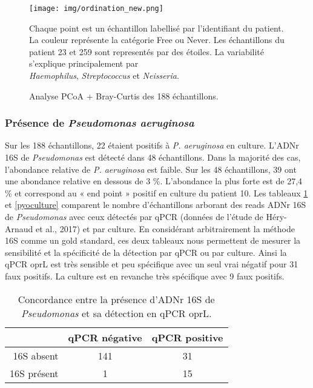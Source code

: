 \documentclass[12pt,a4paper]{article}
\begin{document}
\begin{figure}[H]
\begin{center}
\texttt{[image: img/ordination\_new.png]}\hfill
\caption{Analyse PCoA + Bray-Curtis des 188 échantillons.}
Chaque point est un échantillon labellisé par l'identifiant du patient. La couleur représente la catégorie Free ou Never. Les échantillons du patient 23 et 259 sont representés par des étoiles. La variabilité s'explique principalement par \\ \textit{Haemophilus}, \textit{Streptococcus} et \textit{Neisseria}.
\label{ordination2}
\end{center}
\end{figure}



\subsubsection{Présence de \textit{Pseudomonas aeruginosa}}
Sur les 188 échantillons, 22 étaient positifs à \textit{P. aeruginosa} en culture. L'ADNr 16S de \textit{Pseudomonas} est détecté dans 48 échantillons. Dans la majorité des cas, l'abondance relative de \textit{P. aeruginosa} est faible. Sur les 48 échantillons, 39 ont une abondance relative en dessous de 3 \%. L'abondance la plus forte est de 27,4 \% et correspond au « end point » positif en culture du patient 10.
Les tableaux \ref{pyopcr} et \ref{pyoculture} comparent le nombre d'échantillons arborant des reads ADNr 16S de \textit{Pseudomonas} avec ceux détectés par qPCR (données de l'étude de Héry-Arnaud et al., 2017\cite{Hery-Arnaud2017}) et par culture.
En considérant arbitrairement la méthode 16S comme un gold standard, ces deux tableaux nous permettent de mesurer la sensibilité et la spécificité de la détection par qPCR ou par culture.
Ainsi la qPCR oprL est très sensible et peu spécifique avec un seul vrai négatif pour 31 faux positifs.
La culture est en revanche très spécifique avec 9 faux positifs.

  \begin{table}[!h]
      \centering
            \caption{Concordance entre la présence d'ADNr 16S de \textit{Pseudomonas} et sa détection en qPCR oprL.}

      \begin{tabular}{r|c|c}
           & qPCR négative  & qPCR positive \\
           \hline
           16S absent & 141 & 31 \\
           16S présent & 1 & 15   \\

      \end{tabular}
      \label{pyopcr}
  \end{table}
\end{document}
